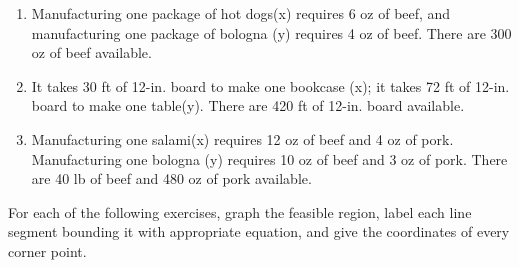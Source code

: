 \documentclass[
  letterpaper,
  DIV=11,
  numbers=noendperiod]{scrreprt}
\providecommand{\tightlist}{%
  \setlength{\itemsep}{0pt}\setlength{\parskip}{0pt}}\usepackage{longtable,booktabs,array}
\begin{document}
\begin{enumerate}
\def\labelenumi{\arabic{enumi}.}
\tightlist
\item
  Manufacturing one package of hot dogs(x) requires 6 oz of beef, and
  manufacturing one package of bologna (y) requires 4 oz of beef. There
  are 300 oz of beef available.
\item
  It takes 30 ft of 12-in. board to make one bookcase (x); it takes 72
  ft of 12-in. board to make one table(y). There are 420 ft of 12-in.
  board available.
\item
  Manufacturing one salami(x) requires 12 oz of beef and 4 oz of pork.
  Manufacturing one bologna (y) requires 10 oz of beef and 3 oz of pork.
  There are 40 lb of beef and 480 oz of pork available.
\end{enumerate}

For each of the following exercises, graph the feasible region, label
each line segment bounding it with appropriate equation, and give the
coordinates of every corner point.
\end{document}

